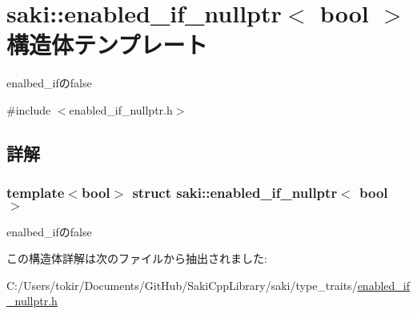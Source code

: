 \hypertarget{structsaki_1_1enabled__if__nullptr}{}\section{saki\+:\+:enabled\+\_\+if\+\_\+nullptr$<$ bool $>$ 構造体テンプレート}
\label{structsaki_1_1enabled__if__nullptr}


enalbed\+\_\+ifのfalse  




{\ttfamily \#include $<$enabled\+\_\+if\+\_\+nullptr.\+h$>$}



\subsection{詳解}
\subsubsection*{template$<$bool$>$\newline
struct saki\+::enabled\+\_\+if\+\_\+nullptr$<$ bool $>$}

enalbed\+\_\+ifのfalse 

この構造体詳解は次のファイルから抽出されました\+:\begin{DoxyCompactItemize}
\item 
C\+:/\+Users/tokir/\+Documents/\+Git\+Hub/\+Saki\+Cpp\+Library/saki/type\+\_\+traits/\mbox{\hyperlink{enabled__if__nullptr_8h}{enabled\+\_\+if\+\_\+nullptr.\+h}}\end{DoxyCompactItemize}
